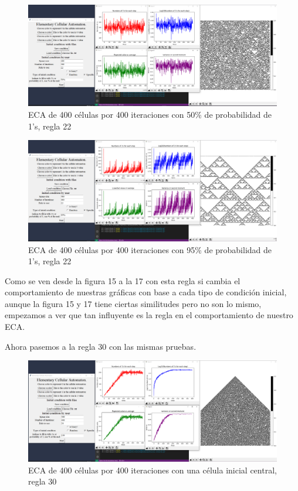 \documentclass[11pt]{article}
\begin{document}
		\begin{figure}[H]
			\centering
			\includegraphics[scale=0.26]{resources/add5.png}
			\caption{ECA de 400 células por 400 iteraciones con 50\% de probabilidad de 1's, regla 22}								\label{fig:picture}
		\end{figure}
		\begin{figure}[H]
			\centering
			\includegraphics[scale=0.26]{resources/add6.png}
			\caption{ECA de 400 células por 400 iteraciones con 95\% de probabilidad de 1's, regla 22}								\label{fig:picture}
		\end{figure}
		Como se ven desde la figura 15 a la 17 con esta regla si cambia el comportamiento de nuestras gráficas con base a cada tipo de condición inicial, aunque la figura 15 y 17 tiene ciertas similitudes pero no son lo mismo, empezamos a ver que tan influyente es la regla en el comportamiento de nuestro ECA. \par 
		Ahora pasemos a la regla 30 con las mismas pruebas.
		\begin{figure}[H]
			\centering
			\includegraphics[scale=0.26]{resources/add7.png}
			\caption{ECA de 400 células por 400 iteraciones con una célula inicial central, regla 30}								\label{fig:picture}
		\end{figure}
\end{document}
